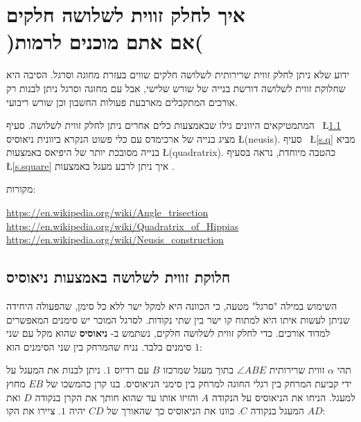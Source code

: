 
\chapter[\R{ איך לחלק זווית לשלושה חלקים )אם אתם מוכנים לרמות( }]%
{איך לחלק זווית לשלושה חלקים\\)אם אתם מוכנים לרמות(}
\label{c.trisect-an-angle}


ידוע שלא ניתן לחלק זווית שרירותית לשלושה  חלקים שווים בעזרת מחוגה וסרגל. הסיבה היא שחלוקת זווית לשלושה דורשת בנייה של שורש שלישי, אבל עם מחוגה וסרגל ניתן לבנות רק אורכים המתקבלים מארבעת פעולות החשבון וכן שורש ריבועי.

המתמטיקאים היוונים גילו שבאמצעות כלים אחרים ניתן לחלק זווית לשלושה. סעיף~%
\L{\ref{s.neusis}}
מציג בנייה של ארכימדס עם כלי פשוט הנקרא ביוונית ניאוסיס
\L{(neusis)}.
סעיף~%
\L{\ref{s.q}}
מביא בנייה מסובכת יותר של היפיאס באמצעות
\qd{}
\L{(quadratrix)}.
כהטבה מיוחדת, נראה בסעיף~%
\L{\ref{s.square}}
איך ניתן לרבע מעגל באמצעות 
\qd{}.


מקורות:

\noindent\url{https://en.wikipedia.org/wiki/Angle_trisection}\\
\url{https://en.wikipedia.org/wiki/Quadratrix_of_Hippias}\\
\url{https://en.wikipedia.org/wiki/Neusis_construction}

\vspace{-2ex}


\section{חלוקת זווית לשלושה באמצעות ניאוסיס}\label{s.neusis}

השימוש במילה "סרגל" מטעה, כי הכוונה היא למקל ישר ללא כל סימן, שהפעולה היחידה שניתן לעשות איתו היא למתוח קו ישר בין שתי נקודות. לסרגל המוכר יש סימנים המאפשרים למדוד אורכים. כדי לחלק זווית לשלושה חלקים, נשתמש ב-%
\textbf{ניאוסיס}
שהוא מקל עם שני סימנים בלבד. נניח שהמרחק בין שני הסימנים הוא
$1$:
\begin{center}
\end{center}
תהי 
$\alpha$
זווית שרירותית
$\angle ABE$
בתוך מעגל שמרכזו
$B$
עם רדיוס
$1$.
ניתן לבנות את המעגל על ידי קביעת המרחק בין רגלי החוגה למרחק בין סימני הניאוסיס. בנו קרן כהמשכו של 
$EB$
מחוץ למעגל. הניחו את הניאוסיס על הנקודה
$A$
והזיזו אותו עד שהוא חותך את הקרן בנקודה 
$D$
ואת המעגל בנקודה
$C$.
כוונו את הניאוסיס כך שהאורך של
$CD$
יהיה
$1$.
ציירו את הקו
$AD$:



